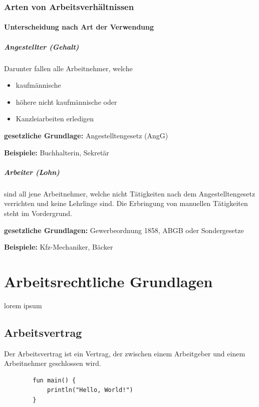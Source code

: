 \documentclass{htblagkr}
\begin{document}
    \subsubsection{Arten von Arbeitsverhältnissen}

    \paragraph{Unterscheidung nach Art der Verwendung}

    \subparagraph{Angestellter (Gehalt)}

    Darunter fallen alle Arbeitnehmer, welche

    \begin{itemize}
        \item{kaufmännische}
        \item{höhere nicht kaufmännische oder}
        \item{Kanzleiarbeiten erledigen}
    \end{itemize}

    \textbf{gesetzliche Grundlage:} Angestelltengesetz (AngG)

    \textbf{Beispiele:} Buchhalterin, Sekretär

    \subparagraph{Arbeiter (Lohn)}

    sind all jene Arbeitnehmer, welche nicht Tätigkeiten nach dem Angestelltengesetz verrichten und keine Lehrlinge sind.
    Die Erbringung von manuellen Tätigkeiten steht im Vordergrund.

    \textbf{gesetzliche Grundlagen:} Gewerbeordnung 1858, ABGB oder Sondergesetze

    \textbf{Beispiele:} Kfz-Mechaniker, Bäcker

    \section{Arbeitsrechtliche Grundlagen}

    lorem ipsum

    \subsection{Arbeitsvertrag}

    Der Arbeitsvertrag ist ein Vertrag, der zwischen einem Arbeitgeber und einem Arbeitnehmer geschlossen wird.

    \begin{verbatim}
        fun main() {
            println("Hello, World!")
        }
    \end{verbatim}
\end{document}
